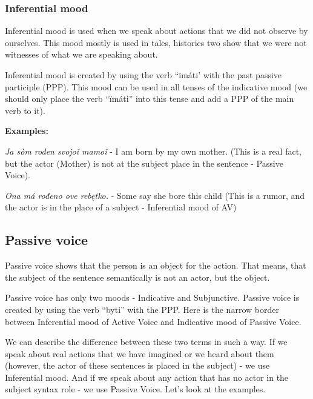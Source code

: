 \subsubsection{Inferential mood}

Inferential mood is used when we speak about actions that we did not observe by ourselves. This mood mostly is used in tales, histories two show that we were not witnesses of what we are speaking about.

Inferential mood is created by using the verb “ïmáti’ with the past passive participle (PPP). This mood can be used in all tenses of the indicative mood (we should only place the verb “ïmáti” into this tense and add a PPP of the main verb to it). 

\textbf{Examples:}

\textit{Ja sòm rođen svojoǐ mamoǐ} - I am born by my own mother. (This is a real fact, but the actor (Mother) is not at the subject place in the sentence - Passive Voice).

\textit{Ona má rođeno ove rebętko.} - Some say she bore this child (This is a rumor, and the actor is in the place of a subject - Inferential mood of AV)

\subsection{Passive voice}

Passive voice shows that the person is an object for the action. That means, that the subject of the sentence semantically is not an actor, but the object. 

Passive voice has only two moods - Indicative and Subjunctive. Passive voice is created by using the verb “byti” with the PPP. Here is the narrow border between Inferential mood of Active Voice and Indicative mood of Passive Voice.

We can describe the difference between these two terms in such a way. If we speak about real actions that we have imagined or we heard about them (however, the actor of these sentences is placed in the subject) - we use Inferential mood. And if we speak about any action that has no actor in the subject syntax role - we use Passive Voice. Let’s look at the examples.





